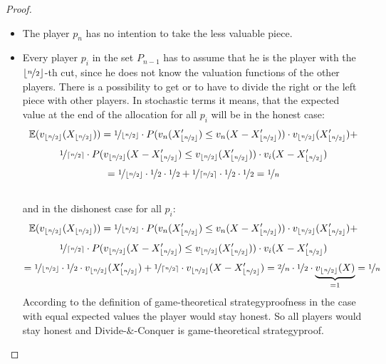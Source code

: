 \begin{proof}
\textcolor{white}{x}
\begin{itemize}
\item The player $p_n$ has no intention to take the less valuable piece.
\item Every player $p_i$ in the set $P_{n-1}$ has to assume that he is the player with the $\lfloor\nicefrac{n}{2}\rfloor$-th cut, since he does not know the valuation functions of the other players. There is a possibility to get or to have to divide the right or the left piece with other players. In stochastic terms it means, that the expected value at the end of the allocation for all $p_i$ will be in the honest case: $$ \mathbb{E}(v_{\lfloor\nicefrac{n}{2}\rfloor}(X_{\lfloor\nicefrac{n}{2}\rfloor}))=\nicefrac{1}{\lfloor\nicefrac{n}{2}\rfloor} \cdot P(v_{n}(X'_{\lfloor\nicefrac{n}{2}\rfloor})\leq v_n(X-X'_{\lfloor\nicefrac{n}{2}\rfloor}))\cdot v_{\lfloor\nicefrac{n}{2}\rfloor}(X'_{\lfloor\nicefrac{n}{2}\rfloor})+$$$$\nicefrac{1}{\lceil\nicefrac{n}{2}\rceil} \cdot P(v_{\lfloor\nicefrac{n}{2}\rfloor}(X-X'_{\lfloor\nicefrac{n}{2}\rfloor})\leq v_{\lfloor\nicefrac{n}{2}\rfloor}(X'_{\lfloor\nicefrac{n}{2}\rfloor}))\cdot v_i(X-X'_{\lfloor\nicefrac{n}{2}\rfloor})$$$$=\nicefrac{1}{{\lfloor\nicefrac{n}{2}\rfloor}} \cdot \nicefrac{1}{2}\cdot \nicefrac{1}{2}+\nicefrac{1}{\lceil\nicefrac{n}{2}\rceil}\cdot \nicefrac{1}{2} \cdot \nicefrac{1}{2}=\nicefrac{1}{n}$$\\ and in the dishonest case for all $p_i$: $$ \mathbb{E}(v_{\lfloor\nicefrac{n}{2}\rfloor}(X_{\lfloor\nicefrac{n}{2}\rfloor}))=\nicefrac{1}{\lfloor\nicefrac{n}{2}\rfloor} \cdot P(v_{n}(X'_{\lfloor\nicefrac{n}{2}\rfloor})\leq v_n(X-X'_{\lfloor\nicefrac{n}{2}\rfloor}))\cdot v_{\lfloor\nicefrac{n}{2}\rfloor}(X'_{\lfloor\nicefrac{n}{2}\rfloor})+$$$$\nicefrac{1}{\lceil\nicefrac{n}{2}\rceil} \cdot P(v_{\lfloor\nicefrac{n}{2}\rfloor}(X-X'_{\lfloor\nicefrac{n}{2}\rfloor})\leq v_{\lfloor\nicefrac{n}{2}\rfloor}(X'_{\lfloor\nicefrac{n}{2}\rfloor}))\cdot v_i(X-X'_{\lfloor\nicefrac{n}{2}\rfloor})$$$$=\nicefrac{1}{{\lfloor\nicefrac{n}{2}\rfloor}} \cdot \nicefrac{1}{2} \cdot v_{\lfloor\nicefrac{n}{2}\rfloor}(X'_{\lfloor\nicefrac{n}{2}\rfloor}) +\nicefrac{1}{\lceil\nicefrac{n}{2}\rceil} \cdot v_{\lfloor\nicefrac{n}{2}\rfloor}(X-X'_{\lfloor\nicefrac{n}{2}\rfloor}) =\nicefrac{2}{n} \cdot \nicefrac{1}{2} \cdot \underbrace{v_{\lfloor\nicefrac{n}{2}\rfloor}(X)}_{=1}=\nicefrac{1}{n}$$ According to the definition of game-theoretical strategyproofness in the case with equal expected values the player would stay honest.  So all players would stay honest and Divide-$\&$-Conquer is game-theoretical strategyproof.
\end{itemize}
\end{proof}
